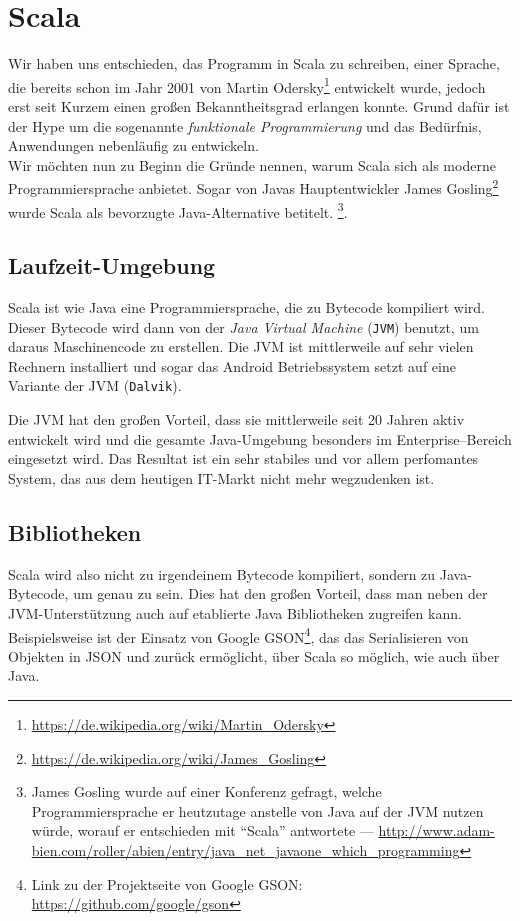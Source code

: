 \chapter{Scala}
Wir haben uns entschieden, das Programm in Scala zu schreiben, einer Sprache, die bereits schon im Jahr 2001 von Martin Odersky\footnote{\url{https://de.wikipedia.org/wiki/Martin_Odersky}} entwickelt wurde, jedoch erst seit Kurzem einen großen Bekanntheitsgrad erlangen konnte. Grund dafür ist der Hype um die sogenannte \textit{funktionale Programmierung} und das Bedürfnis, Anwendungen nebenläufig zu entwickeln.\\
Wir möchten nun zu Beginn die Gründe nennen, warum Scala sich als moderne Programmiersprache anbietet. Sogar von Javas Hauptentwickler James Gosling\footnote{\url{https://de.wikipedia.org/wiki/James_Gosling}} wurde Scala als bevorzugte Java-Alternative betitelt. \footnote{James Gosling wurde auf einer Konferenz gefragt, welche Programmiersprache er heutzutage anstelle von Java auf der JVM nutzen würde, worauf er entschieden mit ``Scala'' antwortete --- \url{http://www.adam-bien.com/roller/abien/entry/java_net_javaone_which_programming}}.

\section{Laufzeit-Umgebung}
Scala ist wie Java eine Programmiersprache, die zu Bytecode kompiliert wird. Dieser Bytecode wird dann von der \textit{Java Virtual Machine} (\texttt{JVM}) benutzt, um daraus Maschinencode zu erstellen. Die JVM ist mittlerweile auf sehr vielen Rechnern installiert und sogar das Android Betriebssystem setzt auf eine Variante der JVM (\texttt{Dalvik}).

Die JVM hat den großen Vorteil, dass sie mittlerweile seit 20 Jahren aktiv entwickelt wird und die gesamte Java-Umgebung besonders im Enterprise--Bereich eingesetzt wird. Das Resultat ist ein sehr stabiles und vor allem perfomantes System, das aus dem heutigen IT-Markt nicht mehr wegzudenken ist.

\section{Bibliotheken}
Scala wird also nicht zu irgendeinem Bytecode kompiliert, sondern zu Java-Bytecode, um genau zu sein. Dies hat den großen Vorteil, dass man neben der JVM-Unterstützung auch auf etablierte Java Bibliotheken zugreifen kann. Beispielsweise ist der Einsatz von Google GSON\footnote{Link zu der Projektseite von Google GSON: \url{https://github.com/google/gson}}, das das Serialisieren von Objekten in JSON und zurück ermöglicht, über Scala so möglich, wie auch über Java.

